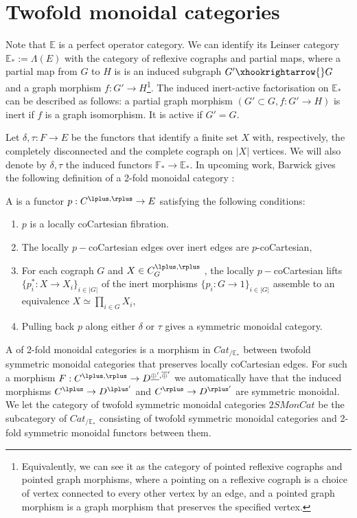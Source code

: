 \section{Twofold monoidal categories}\label{sec:twofold-monoidal}
Note that $\mathbb{E}$ is a perfect operator category. We can identify its Leinser category $\mathbb{E}_*:=\Lambda(E)$ with the category of reflexive cographs and partial maps, where a partial map from $G$ to $H$ is is an induced subgraph $G'\xhookrightarrow{}G$ and a graph morphism $f:G'\rightarrow H$\footnote{Equivalently, we can see it as the category of pointed reflexive cographs and pointed graph morphisms, where a pointing on a reflexive cograph is a choice of vertex connected to every other vertex by an edge, and a pointed graph morphism is a graph morphism that preserves the specified vertex.}. The induced inert-active factorisation on $\mathbb{E}_*$ can be described as follows: a partial graph morphism $(G'\subset G, f:G'\rightarrow H)$ is inert if $f$ is a graph isomorphism. It is active if $G'=G$.

Let $\delta,\tau:F\rightarrow E$ be the functors that identify a finite set $X$ with, respectively, the completely disconnected and the complete cograph on $|X|$ vertices. We will also denote by $\delta,\tau$ the induced functors $\mathbb{F}_*\rightarrow \mathbb{E}_*.$ In upcoming work, Barwick gives the following definition of a 2-fold monoidal category \cite{Bar24}:

\begin{definition}
    A  is a functor $p:C^{\lplus,\rplus}\rightarrow E$ satisfying the following conditions:
    \begin{enumerate}
        \item $p$ is a locally coCartesian fibration.
        \item The locally $p-$coCartesian edges over inert edges are $p$-coCartesian,
        \item For each cograph $G$ and $X\in C^{\lplus,\rplus}_G$ , the locally $p-$coCartesian lifts \newline$\{p_i^*:X\rightarrow X_i\}_{i\in |G|}$ of the inert morphisms $\{p_i:G\rightarrow 1\}_{i\in |G|}$ assemble to an equivalence $X\simeq \prod_{i\in G} X_i$,
        \item Pulling back $p$ along either $\delta$ or $\tau$ gives a symmetric monoidal category.
    \end{enumerate}
A  of 2-fold monoidal categories is a morphism in $Cat_{/\mathbb{E}_*}$ between twofold symmetric monoidal categories that preserves locally coCartesian edges. For such a morphism $F:C^{\lplus,\rplus}\rightarrow D^{\underline{\oplus'},\overline{\oplus}'}$ we automatically have that the induced morphisms $C^{\lplus}\rightarrow D^{\lplus'}$ and $C^{\rplus}\rightarrow D^{\rplus'}$ are symmetric monoidal. We let the category of twofold symmetric monoidal categories $2SMonCat$ be the subcategory of $Cat_{/\mathbb{E}_*}$ consisting of twofold symmetric monoidal categories and 2-fold symmetric monoidal functors between them.
\end{definition}


